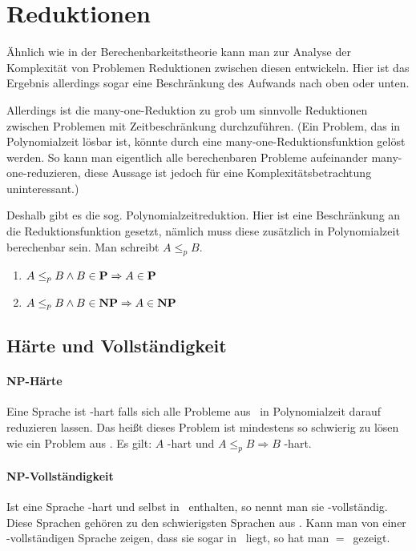 \section{Reduktionen}
Ähnlich wie in der Berechenbarkeitstheorie kann man zur Analyse der Komplexität von Problemen Reduktionen zwischen diesen entwickeln. Hier ist das Ergebnis allerdings sogar eine Beschränkung des Aufwands nach oben oder unten.

Allerdings ist die many-one-Reduktion zu grob um sinnvolle Reduktionen zwischen Problemen mit Zeitbeschränkung durchzuführen. {\scriptsize(Ein Problem, das in Polynomialzeit lösbar ist, könnte durch eine many-one-Reduktionsfunktion gelöst werden. So kann man eigentlich alle berechenbaren Probleme aufeinander many-one-reduzieren, diese Aussage ist jedoch für eine Komplexitätsbetrachtung uninteressant.)}

Deshalb gibt es die sog. Polynomialzeitreduktion. Hier ist eine Beschränkung an die Reduktionsfunktion gesetzt, nämlich muss diese zusätzlich in Polynomialzeit berechenbar sein. Man schreibt $A\leq_p B$.
\begin{enumerate}
	\item $A\leq_p B\wedge B\in \text{\textbf{P}}\Rightarrow A\in\text{\textbf{P}}$
	\item $A\leq_p B\wedge B\in \text{\textbf{NP}}\Rightarrow A\in\text{\textbf{NP}}$
\end{enumerate}


\subsection{Härte und Vollständigkeit}
\paragraph{NP-Härte}
Eine Sprache ist \npoly-hart falls sich alle Probleme aus \npoly\ in Polynomialzeit darauf reduzieren lassen. Das heißt dieses Problem ist mindestens so schwierig zu lösen wie ein Problem aus \npoly. Es gilt: $A$ \npoly-hart und $A\leq_p B\Rightarrow B$ \npoly-hart.
\paragraph{NP-Vollständigkeit}
Ist eine Sprache \npoly-hart und selbst in \npoly\ enthalten, so nennt man sie \npoly-vollständig. Diese Sprachen gehören zu den schwierigsten Sprachen aus \npoly. Kann man von einer \npoly-vollständigen Sprache zeigen, dass sie sogar in \poly\ liegt, so hat man \poly$=$\npoly\ gezeigt.

